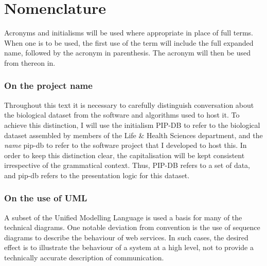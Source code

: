 

\newpage
\section*{Nomenclature}\label{sec:nomenclature}
Acronyms and initialisms will be used where appropriate in place of
full terms. When one is to be used, the first use of the term will
include the full expanded name, followed by the acronym in
parenthesis. The acronym will then be used from thereon in.


\subsubsection*{On the project name}
Throughout this text it is necessary to carefully distinguish
conversation about the biological dataset from the software and
algorithms used to host it. To achieve this distinction, I will use
the initialism PIP-DB to refer to the biological dataset assembled by
members of the Life \& Health Sciences department, and the
\textit{name} pip-db to refer to the software project that I developed
to host this. In order to keep this distinction clear, the
capitalisation will be kept consistent irrespective of the grammatical
context. Thus, PIP-DB refers to a set of data, and pip-db refers to
the presentation logic for this dataset.


\subsubsection*{On the use of UML}
A subset of the Unified Modelling Language \cite{ibm2003uml} is used a
basis for many of the technical diagrams. One notable deviation from
convention is the use of sequence diagrams \cite{ibm2004sequence} to
describe the behaviour of web services. In such cases, the desired
effect is to illustrate the behaviour of a system at a high level, not
to provide a technically accurate description of communication.


